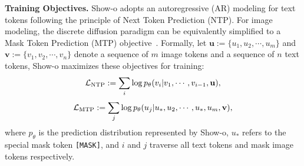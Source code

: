 \noindent \textbf{Training Objectives.}
Show-o adopts an autoregressive (AR) modeling for text tokens following the principle of Next Token Prediction (NTP). 
For image modeling, 
the discrete diffusion paradigm can be equivalently simplified to a Mask Token Prediction (MTP) objective~\cite{chang2022maskgit}. 
Formally, let $\mathbf{u} := \{u_1, u_2, \cdots, u_m\}$ and $\mathbf{v} := \{v_1, v_2, \cdots, v_n\}$ denote a sequence of $m$ image tokens and a sequence of $n$ text tokens, 
Show-o maximizes these objectives for training:
\begin{equation}\small\label{eq:ntp}
\mathcal{L}_{\text{NTP}} := \sum_i \log p_\theta(v_i | v_1, \cdots , v_{i-1}, \mathbf{u}), 
\end{equation}
\begin{equation}\small\label{eq:mtp}
\mathcal{L}_{\text{MTP}} :=\sum_j \log p_\theta(u_j | u_*, u_2, \cdots,u_*,u_m, \mathbf{v}),
\end{equation}
where $p_\theta$ is the prediction distribution represented by Show-o, $u_*$ refers to the special mask token \texttt{[MASK]}, and 
$i$ and $j$ traverse all text tokens and mask image tokens respectively.

